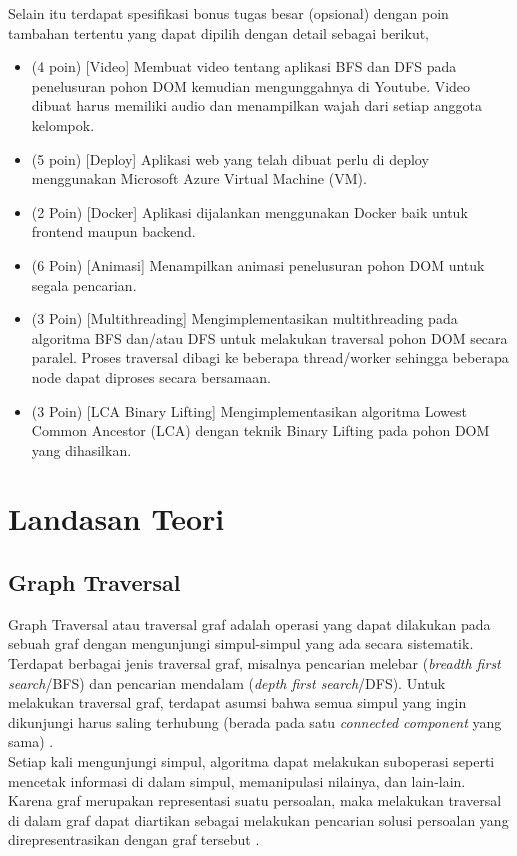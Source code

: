 \documentclass[12pt,a4paper]{article}
\begin{document}
Selain itu terdapat spesifikasi bonus tugas besar (opsional) dengan poin tambahan tertentu yang dapat dipilih dengan detail sebagai berikut,
\begin{itemize}
    \item (4 poin) [Video] Membuat video tentang aplikasi BFS dan DFS pada penelusuran pohon DOM kemudian mengunggahnya di Youtube. Video dibuat harus memiliki audio dan menampilkan wajah dari setiap anggota kelompok.
    \item (5 poin) [Deploy] Aplikasi web yang telah dibuat perlu di deploy menggunakan Microsoft Azure Virtual Machine (VM).
    \item (2 Poin) [Docker] Aplikasi dijalankan menggunakan Docker baik untuk frontend maupun backend.
    \item (6 Poin) [Animasi] Menampilkan animasi penelusuran pohon DOM untuk segala pencarian.
    \item (3 Poin) [Multithreading] Mengimplementasikan multithreading pada algoritma BFS dan/atau DFS untuk melakukan traversal pohon DOM secara paralel. Proses traversal dibagi ke beberapa thread/worker sehingga beberapa node dapat diproses secara bersamaan.
    \item (3 Poin) [LCA Binary Lifting] Mengimplementasikan algoritma Lowest Common Ancestor (LCA) dengan teknik Binary Lifting pada pohon DOM yang dihasilkan.
\end{itemize}

\pagebreak

\section{Landasan Teori}

\subsection{Graph Traversal}
Graph Traversal atau traversal graf adalah operasi yang dapat dilakukan pada sebuah graf dengan mengunjungi simpul-simpul yang ada secara sistematik.
Terdapat berbagai jenis traversal graf, misalnya pencarian melebar (\textit{breadth first search}/BFS) dan pencarian mendalam (\textit{depth first search}/DFS).
Untuk melakukan traversal graf, terdapat asumsi bahwa semua simpul yang ingin dikunjungi harus saling terhubung (berada pada satu \textit{connected component} yang sama) \cite{stima-graph-1}.\\

Setiap kali mengunjungi simpul, algoritma dapat melakukan suboperasi seperti mencetak informasi di dalam simpul, memanipulasi nilainya, dan lain-lain.
Karena graf merupakan representasi suatu persoalan, maka melakukan traversal di dalam graf dapat diartikan sebagai melakukan pencarian solusi persoalan yang direpresentrasikan dengan graf tersebut \cite{stima-graph-1}. \\
\end{document}
